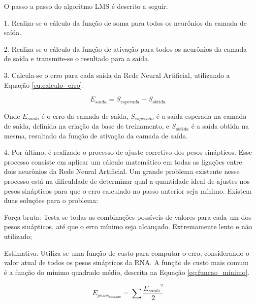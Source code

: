 \documentclass[12pt,oneside,a4paper,chapter=TITLE,section=TITLE,sumario
		=tradicional]{abntex2}
\begin{document}
		O passo a passo do algoritmo LMS é descrito a seguir.
		
		\begin{lista}
			\item[1.] Realiza-se o cálculo da função de soma para todos os neurônios da camada de saída.
			
			\item[2.] Realiza-se o cálculo da função de ativação para todos os neurônios da camada de saída e transmite-se o resultado para a saída.
			
			\item[3.] Calcula-se o erro para cada saída da Rede Neural Artificial, utilizando a Equação \ref{eq:calculo_erro}.
			
			\begin{equation}
			\label{eq:calculo_erro}
			E_{saida} = S_{esperada} - S_{obtida}
			\end{equation}	
			
			Onde $E_{saida}$ é o erro da camada de saída, $S_{esperada}$ é a saída esperada na camada de saída, definida na criação da base de treinamento, e $S_{obtida}$ é a saída obtida na mesma, resultado da função de ativação da camada de saída.	
			
			\item[4.]Por último, é realizado o processo de ajuste corretivo dos pesos sinápticos. Esse processo consiste em aplicar um cálculo matemático em todas as ligações entre dois neurônios da Rede Neural Artificial. Um grande problema existente nesse processo está na dificuldade de determinar qual a quantidade ideal de ajustes nos pesos sinápticos para que o erro calculado no passo anterior seja mínimo. Existem duas soluções para o problema:
			
			\begin{lista}
				\item Força bruta: Testa-se todas as combinações possíveis de valores para cada um dos pesos sinápticos, até que o erro mínimo seja alcançado. Extremamente lento e não utilizado;
				
				\item Estimativa: Utiliza-se uma função de custo para computar o erro, considerando o valor atual de todos os pesos sinápticos da RNA. A função de custo mais comum é a função do mínimo quadrado médio, descrita na Equação \ref{eq:funcao_minimo}.
								
				\begin{equation}
				\label{eq:funcao_minimo}
				E_{pesos_{camada}} = \sum{\frac{ {E_{saida}}^2}{2}}
				\end{equation}
				

\end{lista}
\end{lista}
\end{document}
